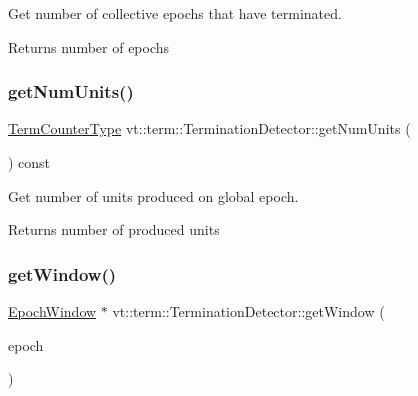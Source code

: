 Get number of collective epochs that have terminated. 

\begin{DoxyReturn}{Returns}
number of epochs 
\end{DoxyReturn}
\mbox{\label{structvt_1_1term_1_1_termination_detector_aa5802cb6f199f3359b1a85058102220c}} 
\subsubsection{\texorpdfstring{get\+Num\+Units()}{getNumUnits()}}
{\footnotesize\ttfamily \hyperlink{namespacevt_1_1term_a4fd378cdb0c36683afc1b3399d685f7f}{Term\+Counter\+Type} vt\+::term\+::\+Termination\+Detector\+::get\+Num\+Units (\begin{DoxyParamCaption}{ }\end{DoxyParamCaption}) const}



Get number of units produced on global epoch. 

\begin{DoxyReturn}{Returns}
number of produced units 
\end{DoxyReturn}
\mbox{\label{structvt_1_1term_1_1_termination_detector_a9fb190f8db25f2296025de31dc7df72c}} 
\subsubsection{\texorpdfstring{get\+Window()}{getWindow()}}
{\footnotesize\ttfamily \hyperlink{structvt_1_1term_1_1_epoch_window}{Epoch\+Window} $\ast$ vt\+::term\+::\+Termination\+Detector\+::get\+Window (\begin{DoxyParamCaption}\item[{\hyperlink{namespacevt_a985a5adf291c34a3ca263b3378388236}{Epoch\+Type} const \&}]{epoch }\end{DoxyParamCaption})\hspace{0.3cm}{\ttfamily [private]}}



